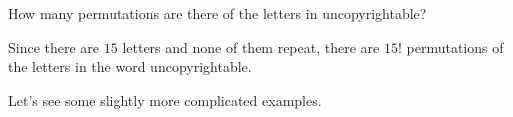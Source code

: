 \begin{exer}
How many permutations are there of the letters in {\sc uncopyrightable}?

\noindent
\answerline
\begin{answer}
Since there are $15$ letters and none of them repeat, there are $15!$ permutations
of the letters in the word {\sc uncopyrightable}.
\end{answer}
\end{exer}

%

Let's see some slightly more complicated examples.

